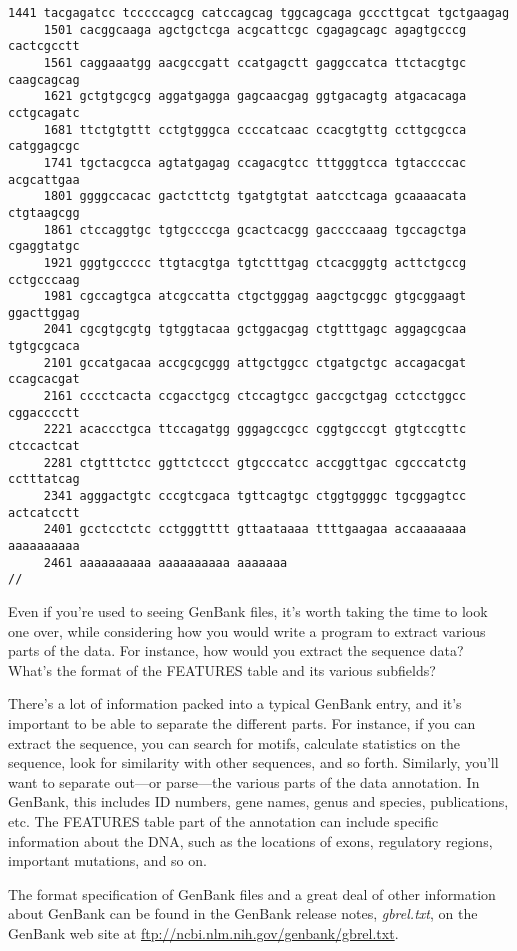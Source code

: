 \begin{lstlisting}[language={},basicstyle=\small\tt,breaklines=false]
     1441 tacgagatcc tcccccagcg catccagcag tggcagcaga gcccttgcat tgctgaagag
     1501 cacggcaaga agctgctcga acgcattcgc cgagagcagc agagtgcccg cactcgcctt
     1561 caggaaatgg aacgccgatt ccatgagctt gaggccatca ttctacgtgc caagcagcag
     1621 gctgtgcgcg aggatgagga gagcaacgag ggtgacagtg atgacacaga cctgcagatc
     1681 ttctgtgttt cctgtgggca ccccatcaac ccacgtgttg ccttgcgcca catggagcgc
     1741 tgctacgcca agtatgagag ccagacgtcc tttgggtcca tgtaccccac acgcattgaa
     1801 ggggccacac gactcttctg tgatgtgtat aatcctcaga gcaaaacata ctgtaagcgg
     1861 ctccaggtgc tgtgccccga gcactcacgg gaccccaaag tgccagctga cgaggtatgc
     1921 gggtgccccc ttgtacgtga tgtctttgag ctcacgggtg acttctgccg cctgcccaag
     1981 cgccagtgca atcgccatta ctgctgggag aagctgcggc gtgcggaagt ggacttggag
     2041 cgcgtgcgtg tgtggtacaa gctggacgag ctgtttgagc aggagcgcaa tgtgcgcaca
     2101 gccatgacaa accgcgcggg attgctggcc ctgatgctgc accagacgat ccagcacgat
     2161 cccctcacta ccgacctgcg ctccagtgcc gaccgctgag cctcctggcc cggacccctt
     2221 acaccctgca ttccagatgg gggagccgcc cggtgcccgt gtgtccgttc ctccactcat
     2281 ctgtttctcc ggttctccct gtgcccatcc accggttgac cgcccatctg cctttatcag
     2341 agggactgtc cccgtcgaca tgttcagtgc ctggtggggc tgcggagtcc actcatcctt
     2401 gcctcctctc cctgggtttt gttaataaaa ttttgaagaa accaaaaaaa aaaaaaaaaa
     2461 aaaaaaaaaa aaaaaaaaaa aaaaaaa
//
\end{lstlisting}

Even if you're used to seeing GenBank files, it's worth taking the time to look one over, while considering how you would write a program to extract various parts of the data. For instance, how would you extract the sequence data? What's the format of the FEATURES table and its various subfields?

There's a lot of information packed into a typical GenBank entry, and it's important to be able to separate the different parts. For instance, if you can extract the sequence, you can search for motifs, calculate statistics on the sequence, look for similarity with other sequences, and so forth. Similarly, you'll want to separate out—or parse—the various parts of the data annotation. In GenBank, this includes ID numbers, gene names, genus and species, publications, etc. The FEATURES table part of the annotation can include specific information about the DNA, such as the locations of exons, regulatory regions, important mutations, and so on.

The format specification of GenBank files and a great deal of other information about GenBank can be found in the GenBank release notes, \textit{gbrel.txt}, on the GenBank web site at \href{ftp://ncbi.nlm.nih.gov/genbank/gbrel.txt}{ftp://ncbi.nlm.nih.gov/genbank/gbrel.txt}.

